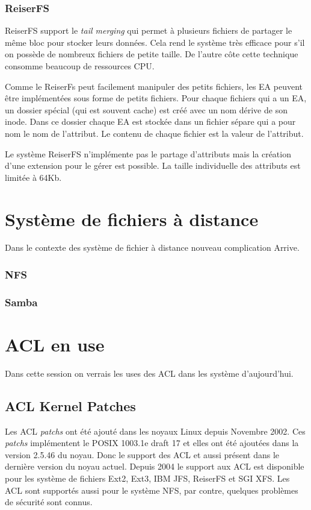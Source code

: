 \documentclass{article}
\begin{document}
\subsubsection*{ReiserFS}

ReiserFS support le \emph{tail merging} qui permet à plusieurs fichiers de partager le même bloc pour stocker leurs données. Cela rend le système très efficace pour s'il on possède de nombreux fichiers de petite taille. De l'autre côte cette technique consomme beaucoup de ressources CPU. 
	
Comme le ReiserFs peut facilement manipuler des petits fichiers, les EA peuvent être implémentées sous forme de petits fichiers. Pour chaque fichiers qui a un EA, un dossier spécial (qui est souvent cache) est créé avec un nom dérive de son inode. Dans ce dossier chaque EA est stockée dans un fichier sépare qui a pour nom le nom de l'attribut. Le contenu de chaque fichier est la valeur de l'attribut.

Le système ReiserFS n'implémente pas le partage d'attributs mais la création d'une extension pour le gérer est possible. La taille individuelle des attributs est limitée à 64Kb.

\section*{Système de fichiers à distance}

Dans le contexte des système de fichier à distance nouveau complication Arrive. 

\subsubsection*{NFS}



\subsubsection*{Samba}


\section{ACL en use}

Dans cette session on verrais les uses des ACL dans les système d'aujourd'hui. 

\subsection{ACL Kernel Patches}
Les ACL \emph{patchs} ont été ajouté dans les noyaux Linux depuis Novembre 2002. Ces \emph{patchs} implémentent le POSIX 1003.1e draft 17 et elles ont été ajoutées dans la version 2.5.46 du noyau. Donc le support des ACL et aussi présent dans le dernière version du noyau actuel. Depuis 2004 le support aux ACL est disponible pour les système de fichiers Ext2, Ext3, IBM JFS, ReiserFS et SGI XFS. Les ACL sont supportés aussi pour le système NFS, par contre, quelques problèmes de sécurité sont connus\cite{nfs_problem}. 
\end{document}
